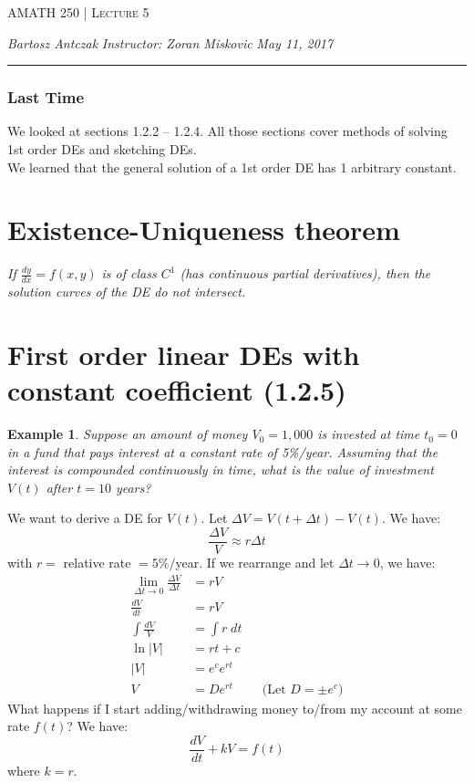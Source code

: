\documentclass{report}
\newcommand{\lectureNum}{5}
\newcommand{\curDate}{May 11, 2017}
\newcommand{\course}{AMATH 250}
\newcommand{\instructor}{Zoran Miskovic}
\newtheorem{ex}{Example}[section]
\begin{document}
\begin{center}
\begin{Large}
\textsc{\course{} | Lecture \lectureNum{}}
\end{Large}
\end{center} 
\noindent \textit{Bartosz Antczak} \hfill
\textit{Instructor: \instructor{}} \hfill
\textit{\curDate{}}
\rule{\textwidth}{0.4pt}
\subsubsection{Last Time}
We looked at sections 1.2.2 -- 1.2.4. All those sections cover methods of solving 1st order DEs and sketching DEs. \\
We learned that the general solution of a 1st order DE has 1 arbitrary constant.
\section{Existence-Uniqueness theorem}
\begin{center}
    \textit{If $\frac{dy}{dx} = f(x,y)$ is of class $C^1$ (has continuous partial derivatives), then the solution curves of the DE do not intersect.}
\end{center}
\section{First order linear DEs with constant coefficient (1.2.5)}
\begin{ex}
Suppose an amount of money $V_0 = 1,000$ is invested at time $t_0 = 0$ in a fund that pays interest at a constant rate of 5\%/year. Assuming that the interest is compounded continuously in time, what is the value of investment $V(t)$ after $t=10$ years?
\end{ex}
\noindent We want to derive a DE for $V(t)$. Let $\Delta V = V(t + \Delta t) - V(t)$. We have:
$$\frac{\Delta V}{V} \approx r \Delta t$$
with $r = $ relative rate $= 5\% / $year.
If we rearrange and let $\Delta t \to 0$, we have:
\begin{align}
    \lim_{\Delta t \to 0} \frac{\Delta V}{\Delta t} &= r V \\
    \frac{dV}{dt} &= rV \\
    \int \frac{dV}{V} &= \int r \; dt\\
    \ln |V| &= rt + c \\
    |V| &= e^ce^{rt} \\
    V &= De^{rt} && \text{(Let }D = \pm e^c)
\end{align}
What happens if I start adding/withdrawing money to/from my account at some rate $f(t)$? We have:
$$\frac{dV}{dt} + kV = f(t)$$
where $k = r$.
\end{document}
